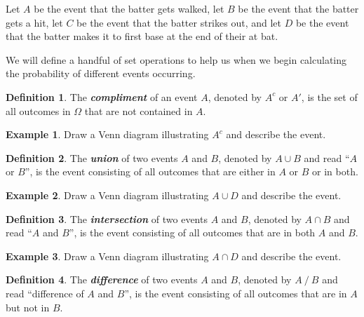 \documentclass[
  11pt,
]{book}
\theoremstyle{definition}
\newtheorem{definition}{Definition}[chapter]
\theoremstyle{definition}
\newtheorem{example}{Example}[chapter]
\theoremstyle{definition}
\theoremstyle{definition}
\theoremstyle{remark}
\begin{document}
Let \(A\) be the event that the batter gets walked, let \(B\) be the event that the batter gets a hit, let \(C\) be the event that the batter strikes out, and let \(D\) be the event that the batter makes it to first base at the end of their at bat.

We will define a handful of set operations to help us when we begin calculating the probability of different events occurring.

\begin{definition}
The \textbf{\emph{compliment}} of an event \(A\), denoted by \(A^c\) or \(A'\), is the set of all outcomes in \(\Omega\) that are not contained in \(A\).
\end{definition}

\begin{example}
Draw a Venn diagram illustrating \(A^c\) and describe the event.
\end{example}

\hfill\break
\hfill\break
\hfill\break
\hfill\break
\hfill\break
\vfill

\begin{definition}
The \textbf{\emph{union}} of two events \(A\) and \(B\), denoted by \(A \cup B\) and read ``\(A\) or \(B\)'', is the event consisting of all outcomes that are either in \(A\) or \(B\) or in both.
\end{definition}

\begin{example}
Draw a Venn diagram illustrating \(A \cup D\) and describe the event.
\end{example}

\hfill\break
\hfill\break
\hfill\break
\hfill\break
\hfill\break
\vfill

\newpage

\begin{definition}
The \textbf{\emph{intersection}} of two events \(A\) and \(B\), denoted by \(A \cap B\) and read ``\(A\) and \(B\)'', is the event consisting of all outcomes that are in both \(A\) and \(B\).
\end{definition}

\begin{example}
Draw a Venn diagram illustrating \(A \cap D\) and describe the event.
\end{example}

\hfill\break
\hfill\break
\hfill\break
\hfill\break
\hfill\break
\vfill

\begin{definition}
The \textbf{\emph{difference}} of two events \(A\) and \(B\), denoted by \(A \mathbin{/} B\) and read ``difference of \(A\) and \(B\)'', is
the event consisting of all outcomes that are in \(A\) but not in \(B\).
\end{definition}
\end{document}
